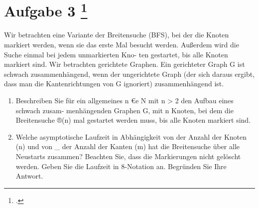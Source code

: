 \documentclass{lehramt-informatik-aufgabe}
\begin{document}
\liAufgabenTitel{}
\section{Aufgabe 3
\footcite{66115:2021:03}}

Wir betrachten eine Variante der Breitensuche (BFS), bei der die Knoten
markiert werden, wenn sie das erste Mal besucht werden. Außerdem wird
die Suche einmal bei jedem unmarkierten Kno- ten gestartet, bis alle
Knoten markiert sind. Wir betrachten gerichtete Graphen. Ein gerichteter
Graph G ist schwach zusammenhängend, wenn der ungerichtete Graph (der
sich daraus ergibt, dass man die Kantenrichtungen von G ignoriert)
zusammenhängend ist.

\begin{enumerate}

\item Beschreiben Sie für ein allgemeines n €e N mit n > 2 den Aufbau
eines schwach zusam- menhängenden Graphen G, mit n Knoten, bei dem die
Breitensuche ®(n) mal gestartet werden muss, bis alle Knoten markiert
sind.


\item Welche asymptotische Laufzeit in Abhängigkeit von der Anzahl der
Knoten (n) und von _ der Anzahl der Kanten (m) hat die Breitensuche über
alle Neustarts zusammen? Beachten Sie, dass die Markierungen nicht
gelöscht werden. Geben Sie die Laufzeit in 8-Notation an. Begründen Sie
Ihre Antwort.
\end{enumerate}
\end{document}
